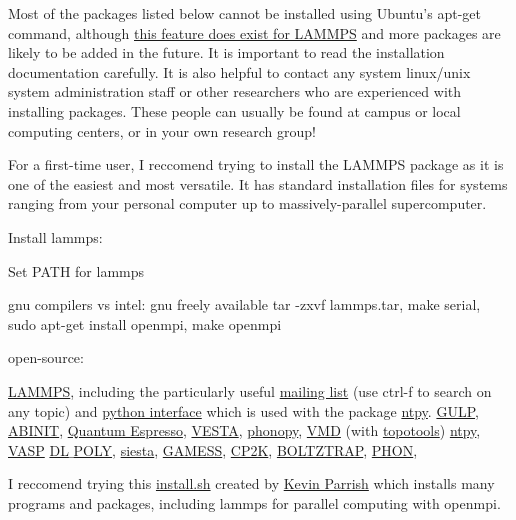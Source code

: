 Most of the packages listed below cannot be installed using Ubuntu's 
apt-get command, although 
\href{http://lammps.sandia.gov/download.html#ubuntu}
{this feature does exist for LAMMPS} and more packages are likely 
to be added in the future. It is important to read the installation 
documentation carefully. It is also helpful to contact any system 
linux/unix system administration staff or other researchers who are 
experienced with installing packages. These people can usually be 
found at campus or local computing centers, or in your own 
research group! 

For a first-time user, I reccomend trying to install the LAMMPS 
package as it is one of the easiest and most versatile. It has 
standard installation files for systems ranging from your 
personal computer up to massively-parallel supercomputer. 

Install lammps:

Set PATH for lammps

gnu compilers vs intel: gnu freely available
tar -zxvf lammps.tar, make serial, sudo apt-get install openmpi, make openmpi

open-source: 

\href{http://lammps.sandia.gov/}{LAMMPS}, including the particularly 
useful 
\href{http://lammps.sandia.gov/threads/threads.html}{mailing list} 
(use ctrl-f to search on any topic)  
and
\href{http://lammps.sandia.gov/doc/Section_python.html}
{python interface} which is used with the package 
\href{http://github.com/ntpl/ntpy}{ntpy}. 
\href{http://projects.ivec.org/gulp/}{GULP}, 
\href{http://www.abinit.org/}{ABINIT}, 
\href{http://www.quantum-espresso.org/}{Quantum Espresso}, 
\href{http://jp-minerals.org/vesta/en/}{VESTA}, 
\href{http://phonopy.sourceforge.net/}{phonopy}, 
\href{http://www.ks.uiuc.edu/Research/vmd/}{VMD} 
(with 
\href{https://sites.google.com/site/akohlmey/software/topotools}
{topotools})
\href{http://github.com/ntpl/ntpy}{ntpy},
\href{https://www.vasp.at/}{VASP}
\href{http://www.stfc.ac.uk/CSE/randd/ccg/software/DL_POLY/25526.aspx}
{DL$\_$POLY}, 
\href{http://icmab.cat/leem/siesta/}
{siesta}, 
\href{http://www.msg.ameslab.gov/gamess/}{GAMESS}, 
\href{http://www.cp2k.org/}{CP2K}, 
\href{http://www.icams.de/content/departments/ams/madsen/boltztrap.html}{BOLTZTRAP}, 
\href{http://www.homepages.ucl.ac.uk/~ucfbdxa/phon/}{PHON}, 

I reccomend trying this 
\href{https://gist.github.com/kparrish/6064159}{install.sh} created by 
\href{http://www.github.com/kparrish}{Kevin Parrish} which installs 
many programs and packages, including lammps for parallel computing 
with openmpi.

